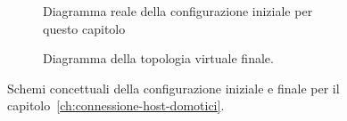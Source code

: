\begin{figure}[H]
    \centering
    \begin{subfigure}{0.44\linewidth}
        \centering
        \usebox{\myimage}
        \caption{Diagramma reale della configurazione iniziale per questo capitolo}
        \label{fig:diag2-host_real}
    \end{subfigure}
    \hfill
    \begin{subfigure}{0.53\linewidth}
        \centering
        \caption{Diagramma della topologia virtuale finale.\newline}
        \label{fig:diag2-host_virtual}
    \end{subfigure}
    \caption{Schemi concettuali della configurazione iniziale e finale per il capitolo~\ref{ch:connessione-host-domotici}.}
\end{figure}

